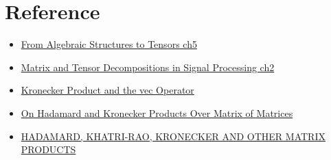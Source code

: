 \section{Reference}
\begin{itemize}
    \item \href{}{From Algebraic Structures to Tensors ch5}
    \item \href{}{Matrix and Tensor Decompositions in Signal Processing ch2}
    \item \href{https://www.ime.unicamp.br/~cnaber/Kronecker.pdf}{Kronecker Product and the vec Operator}
    \item \href{https://www.refaad.com/Files/GLM/GLM-4-1-3.pdf}{On Hadamard and Kronecker Products Over Matrix of Matrices}
    \item \href{https://citeseerx.ist.psu.edu/document?repid=rep1&type=pdf&doi=f087fb761b13f83f14c2409c0f7a0b072812458d}{HADAMARD, KHATRI-RAO, KRONECKER AND OTHER MATRIX PRODUCTS}
\end{itemize}